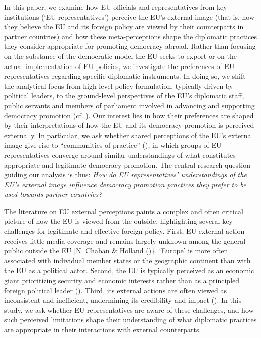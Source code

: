 \documentclass[
  letterpaper,
  DIV=11,
  numbers=noendperiod]{scrartcl}
\begin{document}
In this paper, we examine how EU officials and representatives from key
institutions (`EU representatives') perceive the EU's external image
(that is, how they believe the EU and its foreign policy are viewed by
their counterparts in partner countries) and how these meta-perceptions
shape the diplomatic practices they consider appropriate for promoting
democracy abroad. Rather than focusing on the substance of the
democratic model the EU seeks to export or on the actual implementation
of EU policies, we investigate the preferences of EU representatives
regarding specific diplomatic instruments. In doing so, we shift the
analytical focus from high-level policy formulation, typically driven by
political leaders, to the ground-level perspectives of the EU's
diplomatic staff, public servants and members of parliament involved in
advancing and supporting democracy promotion (cf.
).
Our interest lies in how their preferences are shaped by their
interpretations of how the EU and its democracy promotion is perceived
externally. In particular, we ask whether shared perceptions of the EU's
external image give rise to ``communities of practice''
(), in
which groups of EU representatives converge around similar
understandings of what constitutes appropriate and legitimate democracy
promotion. The central research question guiding our analysis is thus:
\emph{How do EU representatives' understandings of the EU's external
image influence democracy promotion practices they prefer to be used
towards partner countries?}

The literature on EU external perceptions paints a complex and often
critical picture of how the EU is viewed from the outside, highlighting
several key challenges for legitimate and effective foreign policy.
First, EU external action receives little media coverage and remains
largely unknown among the general public outside the EU {[}N. Chaban \&
Holland ()\}. `Europe' is more often
associated with individual member states or the geographic continent
than with the EU as a political actor. Second, the EU is typically
perceived as an economic giant prioritizing security and economic
interests rather than as a principled foreign political leader
(). Third, its
external actions are often viewed as inconsistent and inefficient,
undermining its credibility and impact (). In this study, we ask whether EU
representatives are aware of these challenges, and how such perceived
limitations shape their understanding of what diplomatic practices are
appropriate in their interactions with external counterparts.
\end{document}
